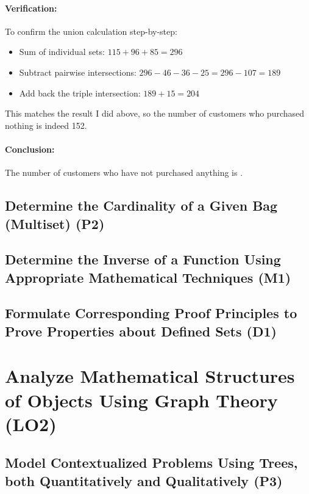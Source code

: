 \documentclass[12pt, a4paper, twoside]{report} %
\begin{document}
\subsubsection*{Verification:}
To confirm the union calculation step-by-step:
\begin{itemize}
  \item Sum of individual sets: $115 + 96 + 85 = 296$
  \item Subtract pairwise intersections: $296 - 46 - 36 - 25 = 296 - 107 = 189$
  \item Add back the triple intersection: $189 + 15 = 204$

\end{itemize}
This matches the result I did above, so the number of customers who purchased nothing is indeed 152.


\subsubsection*{Conclusion:}
The number of customers who have not purchased anything is .

\section{Determine the Cardinality of a Given Bag (Multiset) (P2)}
\label{sec:P2}



\section{Determine the Inverse of a Function Using Appropriate Mathematical Techniques (M1)}

\label{sec:M1}



\section{Formulate Corresponding Proof Principles to Prove Properties about Defined Sets (D1)}

\label{sec:D1}

\chapter{Analyze Mathematical Structures of Objects Using Graph Theory (LO2)}
\label{chap:LO2}

\section{Model Contextualized Problems Using Trees, both Quantitatively and Qualitatively (P3)}
\label{sec:P3}
\end{document}
